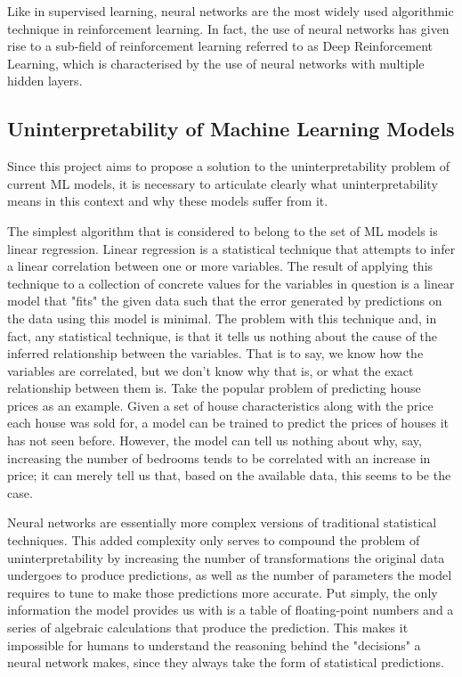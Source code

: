 Like in supervised learning, neural networks are the most widely used algorithmic technique in reinforcement learning. In fact, the use of neural networks has given rise to a sub-field of reinforcement learning referred to as Deep Reinforcement Learning, which is characterised by the use of neural networks with multiple hidden layers.

\subsection{Uninterpretability of Machine Learning Models}
Since this project aims to propose a solution to the uninterpretability problem of current ML models, it is necessary to articulate clearly what uninterpretability means in this context and why these models suffer from it.

The simplest algorithm that is considered to belong to the set of ML models is linear regression. Linear regression is a statistical technique that attempts to infer a linear correlation between one or more variables. The result of applying this technique to a collection of concrete values for the variables in question is a linear model that "fits" the given data such that the error generated by predictions on the data using this model is minimal. The problem with this technique and, in fact, any statistical technique, is that it tells us nothing about the cause of the inferred relationship between the variables. That is to say, we know how the variables are correlated, but we don't know why that is, or what the exact relationship between them is. Take the popular problem of predicting house prices \cite{housing} as an example. Given a set of house characteristics along with the price each house was sold for, a model can be trained to predict the prices of houses it has not seen before. However, the model can tell us nothing about why, say, increasing the number of bedrooms tends to be correlated with an increase in price; it can merely tell us that, based on the available data, this seems to be the case. 

Neural networks are essentially more complex versions of traditional statistical techniques. This added complexity only serves to compound the problem of uninterpretability by increasing the number of transformations the original data undergoes to produce predictions, as well as the number of parameters the model requires to tune to make those predictions more accurate. Put simply, the only information the model provides us with is a table of floating-point numbers and a series of algebraic calculations that produce the prediction. This makes it impossible for humans to understand the reasoning behind the "decisions" a neural network makes, since they always take the form of statistical predictions. 

